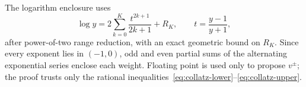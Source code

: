 The logarithm enclosure uses
\[
 \log y=2\sum_{k=0}^{K}\frac{t^{2k+1}}{2k+1}+R_K,
 \qquad t=\frac{y-1}{y+1},
\]
after power-of-two range reduction, with an exact geometric bound on
\(R_K\).  Since every exponent lies in \((-1,0)\), odd and even partial sums
of the alternating exponential series enclose each weight.  Floating point
is used only to propose \(v^\pm\); the proof trusts only the rational
inequalities~\eqref{eq:collatz-lower}--\eqref{eq:collatz-upper}.
